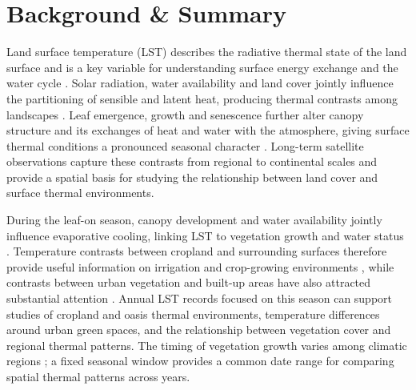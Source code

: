 \section{Background \& Summary}

Land surface temperature (LST) describes the radiative thermal state of the land surface and is a key variable for understanding surface energy exchange and the water cycle \parencite{norman1995terminology,li2013lstReview,li2023globalLstReview}. Solar radiation, water availability and land cover jointly influence the partitioning of sensible and latent heat, producing thermal contrasts among landscapes \parencite{kustas2009thermal}. Leaf emergence, growth and senescence further alter canopy structure and its exchanges of heat and water with the atmosphere, giving surface thermal conditions a pronounced seasonal character \parencite{piao2019phenology}. Long-term satellite observations capture these contrasts from regional to continental scales and provide a spatial basis for studying the relationship between land cover and surface thermal environments.

During the leaf-on season, canopy development and water availability jointly influence evaporative cooling, linking LST to vegetation growth and water status \parencite{kustas2009thermal}. Temperature contrasts between cropland and surrounding surfaces therefore provide useful information on irrigation and crop-growing environments \parencite{anderson2012landsatThermal}, while contrasts between urban vegetation and built-up areas have also attracted substantial attention \parencite{voogt2003urban,weng2004lst}. Annual LST records focused on this season can support studies of cropland and oasis thermal environments, temperature differences around urban green spaces, and the relationship between vegetation cover and regional thermal patterns. The timing of vegetation growth varies among climatic regions \parencite{piao2019phenology}; a fixed seasonal window provides a common date range for comparing spatial thermal patterns across years.

